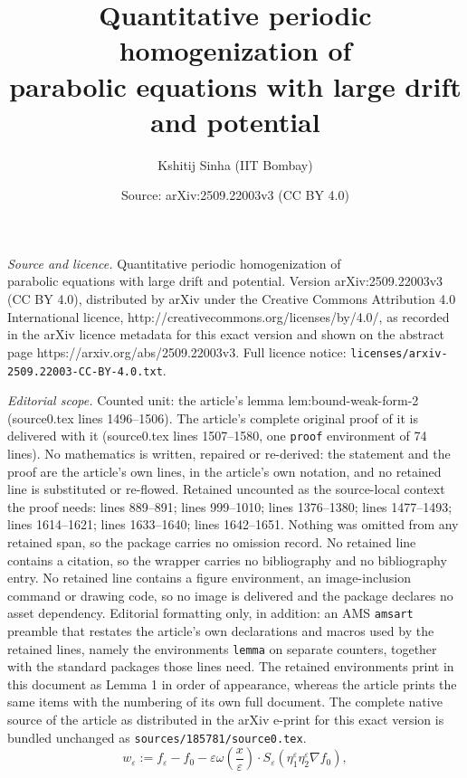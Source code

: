 \documentclass[10pt,a4paper]{amsart}
\title{Quantitative periodic homogenization of\\ parabolic equations with large drift and potential}
\author{Kshitij Sinha (IIT Bombay)}
\date{Source: arXiv:2509.22003v3 (CC BY 4.0)}
\newcommand{\eps}{\varepsilon}
\begin{document}
\maketitle

\noindent\emph{Source and licence.} Quantitative periodic homogenization of\\ parabolic equations with large drift and potential. Version arXiv:2509.22003v3 (CC BY 4.0), distributed by arXiv under the Creative Commons Attribution 4.0 International licence, http://creativecommons.org/licenses/by/4.0/, as recorded in the arXiv licence metadata for this exact version and shown on the abstract page https://arxiv.org/abs/2509.22003v3. Full licence notice: \texttt{licenses/arxiv-2509.22003-CC-BY-4.0.txt}.\par\smallskip

\noindent\textit{Editorial scope.} Counted unit: the article's lemma lem:bound-weak-form-2 (source0.tex lines 1496--1506). The article's complete original proof of it is delivered with it (source0.tex lines 1507--1580, one \texttt{proof} environment of 74 lines). No mathematics is written, repaired or re-derived: the statement and the proof are the article's own lines, in the article's own notation, and no retained line is substituted or re-flowed.  Retained uncounted as the source-local context the proof needs: lines 889--891; lines 999--1010; lines 1376--1380; lines 1477--1493; lines 1614--1621; lines 1633--1640; lines 1642--1651.  Nothing was omitted from any retained span, so the package carries no omission record.  No retained line contains a citation, so the wrapper carries no bibliography and no bibliography entry.  No retained line contains a figure environment, an image-inclusion command or drawing code, so no image is delivered and the package declares no asset dependency.  Editorial formatting only, in addition: an AMS \texttt{amsart} preamble that restates the article's own declarations and macros used by the retained lines, namely the environments \texttt{lemma} on separate counters, together with the standard packages those lines need.  The retained environments print in this document as Lemma 1 in order of appearance, whereas the article prints the same items with the numbering of its own full document.  The complete native source of the article as distributed in the arXiv e-print for this exact version is bundled unchanged as \texttt{sources/185781/source0.tex}.
\begin{equation}\label{eq:defn-weps}
w_\eps := f_\eps - f_0 - \eps \omega\left(\frac{x}{\eps}\right)\cdot S_\eps \left( \eta_1^\eps \eta_2^\eps \nabla f_0 \right),
\end{equation}
\end{document}
